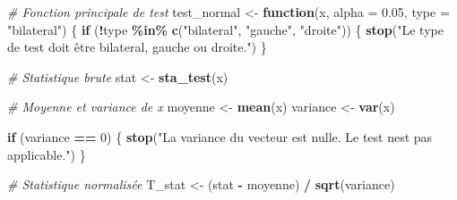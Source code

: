 \documentclass[
  12pt,
]{article}
\newenvironment{Shaded}{\begin{snugshade}}{\end{snugshade}}
\newcommand{\AttributeTok}[1]{\textcolor[rgb]{0.13,0.29,0.53}{#1}}
\newcommand{\CommentTok}[1]{\textcolor[rgb]{0.56,0.35,0.01}{\textit{#1}}}
\newcommand{\ControlFlowTok}[1]{\textcolor[rgb]{0.13,0.29,0.53}{\textbf{#1}}}
\newcommand{\DecValTok}[1]{\textcolor[rgb]{0.00,0.00,0.81}{#1}}
\newcommand{\FloatTok}[1]{\textcolor[rgb]{0.00,0.00,0.81}{#1}}
\newcommand{\FunctionTok}[1]{\textcolor[rgb]{0.13,0.29,0.53}{\textbf{#1}}}
\newcommand{\NormalTok}[1]{#1}
\newcommand{\OtherTok}[1]{\textcolor[rgb]{0.56,0.35,0.01}{#1}}
\newcommand{\SpecialCharTok}[1]{\textcolor[rgb]{0.81,0.36,0.00}{\textbf{#1}}}
\newcommand{\StringTok}[1]{\textcolor[rgb]{0.31,0.60,0.02}{#1}}
\begin{document}
\begin{Shaded}
\begin{Highlighting}[]
\CommentTok{\# Fonction principale de test}
\NormalTok{test\_normal }\OtherTok{\textless{}{-}} \ControlFlowTok{function}\NormalTok{(x, }\AttributeTok{alpha =} \FloatTok{0.05}\NormalTok{, }\AttributeTok{type =} \StringTok{"bilateral"}\NormalTok{) \{}
  \ControlFlowTok{if}\NormalTok{ (}\SpecialCharTok{!}\NormalTok{type }\SpecialCharTok{\%in\%} \FunctionTok{c}\NormalTok{(}\StringTok{"bilateral"}\NormalTok{, }\StringTok{"gauche"}\NormalTok{, }\StringTok{"droite"}\NormalTok{)) \{}
    \FunctionTok{stop}\NormalTok{(}\StringTok{"Le type de test doit être \textquotesingle{}bilateral\textquotesingle{}, \textquotesingle{}gauche\textquotesingle{} ou \textquotesingle{}droite\textquotesingle{}."}\NormalTok{)}
\NormalTok{  \}}
  
  \CommentTok{\# Statistique brute}
\NormalTok{  stat }\OtherTok{\textless{}{-}} \FunctionTok{sta\_test}\NormalTok{(x)}
  
  \CommentTok{\# Moyenne et variance de x}
\NormalTok{  moyenne }\OtherTok{\textless{}{-}} \FunctionTok{mean}\NormalTok{(x)}
\NormalTok{  variance }\OtherTok{\textless{}{-}} \FunctionTok{var}\NormalTok{(x)}
  
  \ControlFlowTok{if}\NormalTok{ (variance }\SpecialCharTok{==} \DecValTok{0}\NormalTok{) \{}
    \FunctionTok{stop}\NormalTok{(}\StringTok{"La variance du vecteur est nulle. Le test n\textquotesingle{}est pas applicable."}\NormalTok{)}
\NormalTok{  \}}
  
  \CommentTok{\# Statistique normalisée}
\NormalTok{  T\_stat }\OtherTok{\textless{}{-}}\NormalTok{ (stat }\SpecialCharTok{{-}}\NormalTok{ moyenne) }\SpecialCharTok{/} \FunctionTok{sqrt}\NormalTok{(variance)}
  

\end{Highlighting}
\end{Shaded}
\end{document}
